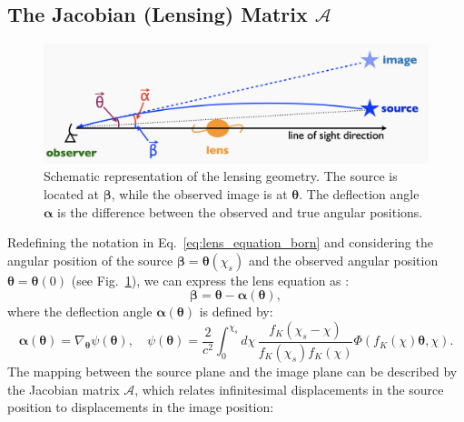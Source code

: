 \subsection{The Jacobian (Lensing) Matrix $\mathcal{A}$}
\begin{figure}[ht]
    \centering
    \includegraphics[width=\textwidth]{figures/Lens_overview_Oguri.png}
    \caption[Schematic representation of the lensing geometry]{Schematic representation of the lensing geometry. The source is located at $\boldsymbol{\beta}$, while the observed image is at $\boldsymbol{\theta}$. The deflection angle $\boldsymbol{\alpha}$ is the difference between the observed and true angular positions.}
    \label{fig:lens_geometry}
\end{figure}
Redefining the notation in Eq.~\eqref{eq:lens_equation_born} and considering the angular position of the source $\boldsymbol{\beta} = \boldsymbol{\theta}(\chi_s)$ and the observed angular position $\boldsymbol{\theta} = \boldsymbol{\theta}(0)$ (see Fig.~\ref{fig:lens_geometry}), we can express the lens equation as \citep{2001PhR...340..291B, 2009A&A...499...31H, 2015RPPh...78h6901K}:
\begin{equation}
    \boldsymbol{\beta} = \boldsymbol{\theta} - \boldsymbol{\alpha}(\boldsymbol{\theta}),
    \label{eq:lens_equation_vector}
\end{equation}
where the deflection angle \( \boldsymbol{\alpha}(\boldsymbol{\theta}) \) is defined by:
\begin{equation}
    \boldsymbol{\alpha}(\boldsymbol{\theta}) = \nabla_{\boldsymbol{\theta}} \psi(\boldsymbol{\theta}), \quad \psi(\boldsymbol{\theta}) = \frac{2}{c^2} \int_0^{\chi_s} d\chi \, \frac{f_K(\chi_s - \chi)}{f_K(\chi_s)f_K(\chi)} \Phi\left(f_K(\chi) \boldsymbol{\theta}, \chi\right).
    \label{eq:deflection_angle}
\end{equation}
The mapping between the source plane and the image plane can be described by the Jacobian matrix $\mathcal{A}$, which relates infinitesimal displacements in the source position to displacements in the image position:
